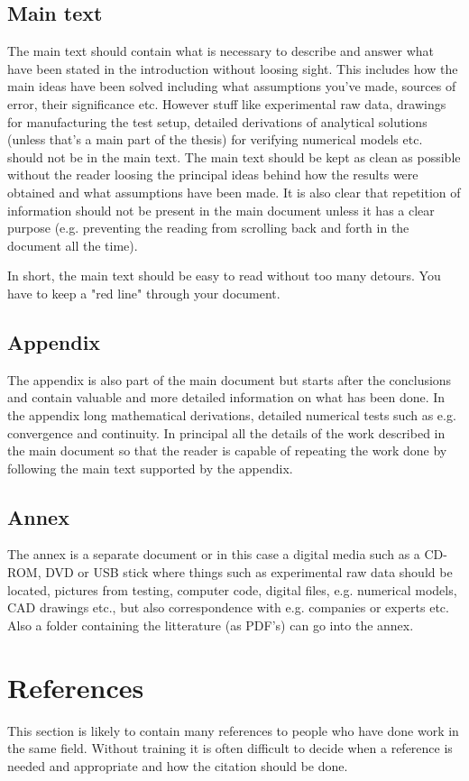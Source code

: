 \subsection{Main text}
The main text should contain what is necessary to describe and answer what have been stated in the introduction without loosing sight. This includes how the main ideas have been solved including what assumptions you've made, sources of error, their significance etc. However stuff like experimental raw data, drawings for manufacturing the test setup, detailed derivations of analytical solutions (unless that's a main part of the thesis) for verifying numerical models etc. should not be in the main text. The main text should be kept as clean as possible without the reader loosing the principal ideas behind how the results were obtained and what assumptions have been made. It is also clear that repetition of information should not be present in the main document unless it has a clear purpose (e.g. preventing the reading from scrolling back and forth in the document all the time).

In short, the main text should be easy to read without too many detours. You have to keep a "red line" through your document.

\subsection{Appendix}
The appendix is also part of the main document but starts after the conclusions and contain valuable and more detailed information on what has been done. In the appendix long mathematical derivations, detailed numerical tests such as e.g. convergence and continuity. In principal all the details of the work described in the main document so that the reader is capable of repeating the work done by following the main text supported by the appendix.

\subsection{Annex}
The annex is a separate document or in this case a digital media such as a CD-ROM, DVD or USB stick where things such as experimental raw data should be located, pictures from testing, computer code, digital files, e.g. numerical models, CAD drawings etc., but also correspondence with e.g. companies or experts etc. Also a folder containing the litterature (as PDF's) can go into the annex.

\section{References}
This section is likely to contain many references to people who have done work in the same field. Without training it is often difficult to decide when a reference is needed and appropriate and how the citation should be done.

